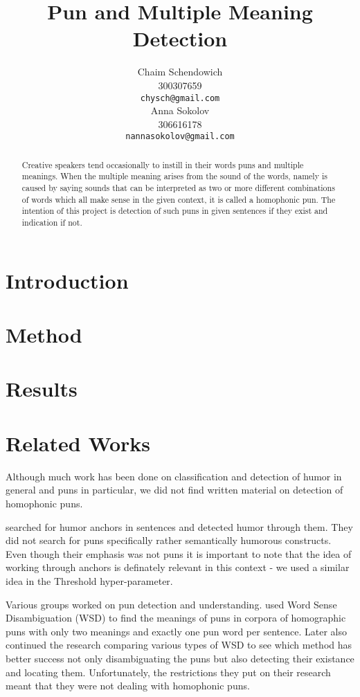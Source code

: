\documentclass[11pt,a4paper]{article}
\title{Pun and Multiple Meaning Detection}
\author{Chaim Schendowich \\
  300307659 \\
  {\tt chysch@gmail.com} \\\And
  Anna Sokolov \\
  306616178 \\
  {\tt nannasokolov@gmail.com} \\}
\date{}
\begin{document}
\maketitle
\begin{abstract}
Creative speakers tend occasionally to instill in their words puns and multiple meanings. When the multiple meaning arises from the sound of the words, namely is caused by saying sounds that can be interpreted as two or more different combinations of words which all make sense in the given context, it is called a homophonic pun. The intention of this project is detection of such puns in given sentences if they exist and indication if not.
\end{abstract}

\section{Introduction}

\section{Method}

\section{Results}

\section{Related Works}

Although much work has been done on classification and detection of humor in general and puns in particular, we did not find written material on detection of homophonic puns.

\citet{yang_lavie_dyer_hovy_2015} searched for humor anchors in sentences and detected humor through them. They did not search for puns specifically rather semantically humorous constructs. Even though their emphasis was not puns it is important to note that the idea of working through anchors is definately relevant in this context - we used a similar idea in the Threshold hyper-parameter.

Various groups worked on pun detection and understanding. \citet{miller_gurevych_2015} used Word Sense Disambiguation (WSD) to find the meanings of puns in corpora of homographic puns with only two meanings and exactly one pun word per sentence. Later \citet{miller_hempelmann_gurevych_2017} also continued the research comparing various types of WSD to see which method has better success not only disambiguating the puns but also detecting their existance and locating them. Unfortunately, the restrictions they put on their research meant that they were not dealing with homophonic puns.
\end{document}
